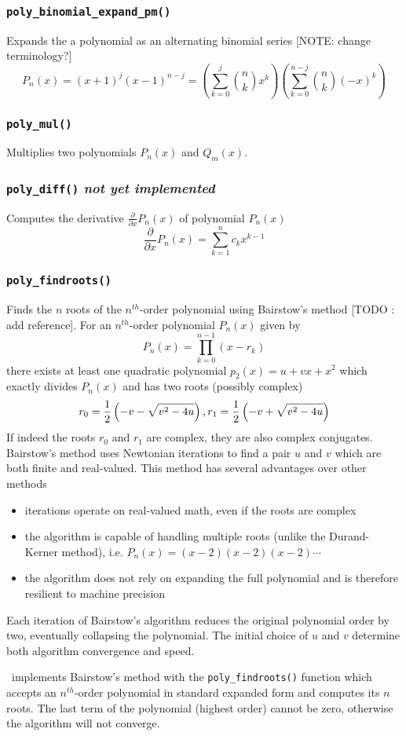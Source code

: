 \subsubsection{{\tt poly\_binomial\_expand\_pm()}}
Expands the a polynomial as an alternating binomial series
[NOTE: change terminology?]
\[
    P_n(x) = (x+1)^j (x-1)^{n-j}
           = \left( \sum_{k=0}^{j}  { {n \choose k}    x^k} \right)
             \left( \sum_{k=0}^{n-j}{ {n \choose k} (-x)^k} \right)
\]

\subsubsection{{\tt poly\_mul()}}
Multiplies two polynomials $P_n(x)$ and $Q_m(x)$.

\subsubsection{{\tt poly\_diff()} {\it not yet implemented}}
Computes the derivative $\frac{\partial}{\partial x}P_n(x)$ of polynomial
$P_n(x)$
\[
    \frac{\partial}{\partial x}P_n(x) = \sum_{k=1}^{n}{c_{k}x^{k-1}}
\]

\subsubsection{{\tt poly\_findroots()}}
Finds the $n$ roots of the $n^{th}$-order polynomial using Bairstow's method
[TODO : add reference].
For an $n^{th}$-order polynomial $P_n(x)$ given by
\[
    P_n(x) = \prod_{k=0}^{n-1}{(x-r_k)}
\]
there exists at least one quadratic polynomial $p_{2}(x)=u + vx + x^2$ which
exactly divides $P_{n}(x)$ and has two roots (possibly complex)
\[
    r_0 = \frac{1}{2}\left(-v-\sqrt{v^2-4u}\right), \; \\
    r_1 = \frac{1}{2}\left(-v+\sqrt{v^2-4u}\right)
\]
If indeed the roots $r_0$ and $r_1$ are complex, they are also complex
conjugates.
Bairstow's method uses Newtonian iterations to find a pair $u$ and $v$ which
are both finite and real-valued.
This method has several advantages over other methods
\begin{itemize}
\item iterations operate on real-valued math, even if the roots are complex
\item the algorithm is capable of handling multiple roots (unlike the
      Durand-Kerner method), i.e. $P_{n}(x) = (x-2)(x-2)(x-2)\cdots$
\item the algorithm does not rely on expanding the full polynomial and is
      therefore resilient to machine precision
\end{itemize}
Each iteration of Bairstow's algorithm reduces the original polynomial order
by two, eventually collapsing the polynomial.
The initial choice of $u$ and $v$ determine both algorithm convergence and
speed.

\liquid\ implements Bairstow's method with the {\tt poly\_findroots()}
function which accepts an $n^{th}$-order polynomial in standard expanded form
and computes its $n$ roots.
The last term of the polynomial (highest order) cannot be zero, otherwise the
algorithm will not converge.


